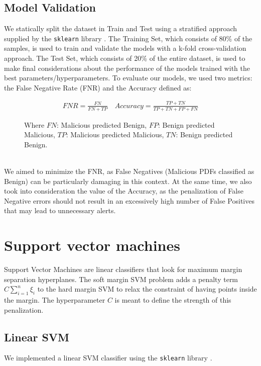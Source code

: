 \documentclass[twocolumn, switch]{article} %
\begin{document}
\subsection{Model Validation}
We statically split the dataset in Train and Test using a stratified approach supplied by the \texttt{sklearn} library \cite{scikit-learn}. The Training Set, which consists of 80\% of the samples, is used to train and validate the models with a k-fold cross-validation approach. The Test Set, which consists of 20\% of the entire dataset, is used to make final considerations about the performance of the models trained with the best parameters/hyperparameters.
To evaluate our models, we used two metrics: the False Negative Rate (FNR) and the Accuracy defined as:
\begin{figure}[ht]
	\begin{align*}
		FNR = \frac{FN}{FN + TP} \quad Accuracy = \frac{TP+TN}{TP+TN+FP+FN}
	\end{align*}
	\caption*{\footnotesize{Where $FN$: Malicious predicted Benign, $FP$: Benign predicted Malicious, $TP$: Malicious predicted Malicious, $TN$: Benign predicted Benign.}}
\end{figure}
\\We aimed to minimize the FNR, as False Negatives (Malicious PDFs classified as Benign) can be particularly damaging in this context.
At the same time, we also took into consideration the value of the Accuracy, as the penalization of False Negative errors should not result in an excessively high number of False Positives that may lead to unnecessary alerts.

\section{Support vector machines}
\label{sec:svm}
Support Vector Machines are linear classifiers that look for maximum margin separation hyperplanes.
The soft margin SVM problem adds a penalty term $C\sum_{i=1}^{n}\xi_i$ to the hard margin SVM to relax the constraint of having points inside the margin. The hyperparameter $C$ is meant to define the strength of this penalization.
\subsection{Linear SVM}
We implemented a linear SVM classifier using the \texttt{sklearn} library \cite{scikit-learn}.
\end{document}
